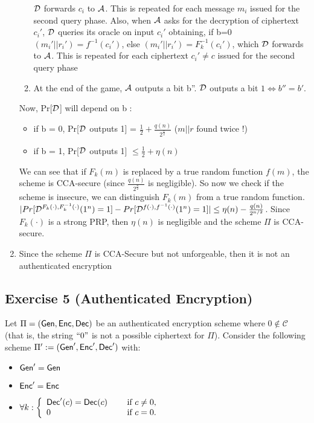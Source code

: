 \begin{solution}
\begin{enumerate}
\begin{enumerate}
        $\mathcal{D}$ forwards $c_i$ to $\mathcal{A}$. This is repeated for each message $m_i$ issued for the second query phase.
        \newline Also, when $\mathcal{A}$ asks for the decryption of ciphertext $c_i'$, $\mathcal{D}$ queries its oracle on input $c_i'$ obtaining, if b=0 $(m_i'||r_i') = f^{-1}(c_i')$, else $(m_i'||r_i') = F^{-1}_k(c_i')$, which $\mathcal{D}$ forwards to $\mathcal{A}$. This is repeated for each ciphertext $c_i' \neq c$ issued for the second query phase
        \item At the end of the game, $\mathcal{A}$ outputs a bit b''. $\mathcal{D}$ outputs a bit $1 \Leftrightarrow b'' = b'$. 
    \end{enumerate}
    Now, Pr[$\mathcal{D}$] will depend on b : 
    \begin{itemize}
        \item if b = 0, Pr[$\mathcal{D}$ outputs 1] = $\frac{1}{2} + \frac{q(n)}{2^{\frac{n}{2}}}$ ($m||r$ found twice !)
        \item if b = 1, Pr[$\mathcal{D}$ outputs 1] $\leq \frac{1}{2} + \eta(n)$
    \end{itemize}
    We can see that if $F_k(m)$ is replaced by a true random function $f(m)$, the scheme is CCA-secure (since $\frac{q(n)}{2^{\frac{n}{2}}}$ is negligible). \newline \newline
    So now we check if the scheme is insecure, we can distinguish $F_k(m)$ from a true random function. $|Pr[\mathcal{D}^{F_k(\cdot),F_k^{-1}(\cdot)}(1^n)=1]-Pr[\mathcal{D}^{f(\cdot),f^{-1}(\cdot)}(1^n)=1]| \leq \eta(n) - \frac{q(n)}{2^{n/2}}$. Since $F_k(\cdot)$ is a strong PRP, then $\eta(n)$ is negligible and the scheme $\Pi$ is CCA-secure.
    \item Since the scheme $\Pi$ is CCA-Secure but not unforgeable, then it is not an authenticated encryption
\end{enumerate}
\end{solution}


\subsection{Exercise 5 (Authenticated Encryption)}
Let $\Pi=(\operatorname{\mathsf{Gen}},\operatorname{\mathsf{Enc}},\operatorname{\mathsf{Dec}})$ be an authenticated encryption scheme where $ 0 \not \in \mathcal{C}$ (that is, the string $``0"$ is not a possible ciphertext for $\Pi$). Consider the following scheme $\Pi':=(\operatorname{\mathsf{Gen}}',\operatorname{\mathsf{Enc}}',\operatorname{\mathsf{Dec}}')$ with:

\begin{itemize}
\item $\operatorname{\mathsf{Gen}}'=\operatorname{\mathsf{Gen}}$
\item $\operatorname{\mathsf{Enc}}'=\operatorname{\mathsf{Enc}}$
\item 	$ \forall k: \left\{ 	\begin{array}{l l}
\operatorname{\mathsf{Dec}}'(c)=\operatorname{\mathsf{Dec}}(c) &\quad \text{ if } c \neq 0,\\
 0 &\quad  \text{ if } c = 0. 
\end{array} \right.   $ 
\end{itemize}

